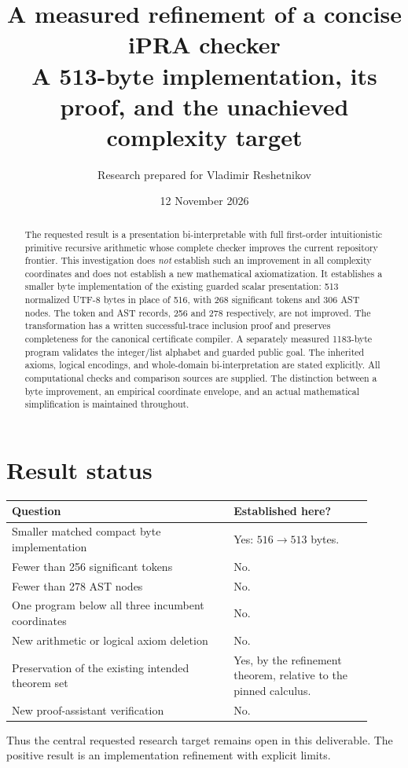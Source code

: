 \documentclass[11pt,letterpaper]{article}
\title{\color{ink}A measured refinement of a concise iPRA checker\\[5pt]
  \large A 513-byte implementation, its proof, and the unachieved complexity target}
\author{Research prepared for Vladimir Reshetnikov}
\date{12 November 2026}
\theoremstyle{definition}
\begin{document}
\maketitle
\begin{abstract}
The requested result is a presentation bi-interpretable with full first-order
intuitionistic primitive recursive arithmetic whose complete checker improves
the current repository frontier. This investigation does \emph{not} establish
such an improvement in all complexity coordinates and does not establish a
new mathematical axiomatization. It establishes a smaller byte implementation
of the existing guarded scalar presentation: 513 normalized UTF-8 bytes in
place of 516, with 268 significant tokens and 306 AST nodes. The token and AST
records, 256 and 278 respectively, are not improved. The transformation has a
written successful-trace inclusion proof and preserves completeness for the
canonical certificate compiler. A separately measured 1183-byte program
validates the integer/list alphabet and guarded public goal. The inherited
axioms, logical encodings, and whole-domain bi-interpretation are stated
explicitly. All computational checks and comparison sources are supplied.
The distinction between a byte improvement, an empirical coordinate envelope,
and an actual mathematical simplification is maintained throughout.
\end{abstract}

\section*{Result status}
\begin{center}
\begin{tabular}{p{0.56\linewidth}p{0.35\linewidth}}
\toprule
Question & Established here?\\
\midrule
Smaller matched compact byte implementation & Yes: $516\to513$ bytes.\\
Fewer than 256 significant tokens & No.\\
Fewer than 278 AST nodes & No.\\
One program below all three incumbent coordinates & No.\\
New arithmetic or logical axiom deletion & No.\\
Preservation of the existing intended theorem set & Yes, by the refinement theorem, relative to the pinned calculus.\\
New proof-assistant verification & No.\\
\bottomrule
\end{tabular}
\end{center}
Thus the central requested research target remains open in this deliverable.
The positive result is an implementation refinement with explicit limits.
\end{document}
